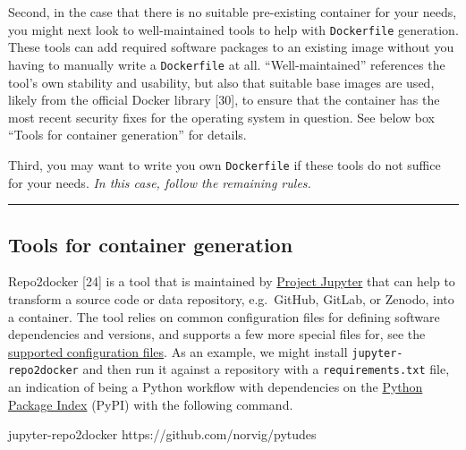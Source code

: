 \documentclass[10pt,letterpaper]{article}
\newenvironment{Shaded}{\begin{snugshade}}{\end{snugshade}}
\newcommand{\ExtensionTok}[1]{#1}
\newcommand{\NormalTok}[1]{#1}
\begin{document}
Second, in the case that there is no suitable pre-existing container for
your needs, you might next look to well-maintained tools to help with
\texttt{Dockerfile} generation. These tools can add required software
packages to an existing image without you having to manually write a
\texttt{Dockerfile} at all. ``Well-maintained'' references the tool's
own stability and usability, but also that suitable base images are
used, likely from the official Docker library {[}30{]}, to ensure that
the container has the most recent security fixes for the operating
system in question. See below box ``Tools for container generation'' for
details.

Third, you may want to write you own \texttt{Dockerfile} if these tools
do not suffice for your needs. \emph{In this case, follow the remaining
rules.}

\begin{center}\rule{0.5\linewidth}{0.5pt}\end{center}

\hypertarget{tools-for-container-generation}{%
\subsection{Tools for container
generation}\label{tools-for-container-generation}}

Repo2docker {[}24{]} is a tool that is maintained by
\href{https://jupyter.org/}{Project Jupyter} that can help to transform
a source code or data repository, e.g.~GitHub, GitLab, or Zenodo, into a
container. The tool relies on common configuration files for defining
software dependencies and versions, and supports a few more special
files for, see the
\href{https://repo2docker.readthedocs.io/en/latest/config_files.html}{supported
configuration files}. As an example, we might install
\texttt{jupyter-repo2docker} and then run it against a repository with a
\texttt{requirements.txt} file, an indication of being a Python workflow
with dependencies on the \href{https://pypi.org/}{Python Package Index}
(PyPI) with the following command.

\footnotesize

\begin{Shaded}
\begin{Highlighting}[]
\ExtensionTok{jupyter-repo2docker}\NormalTok{ https://github.com/norvig/pytudes}
\end{Highlighting}
\end{Shaded}

\normalsize
\end{document}

